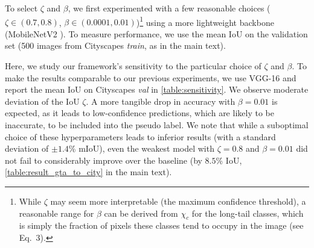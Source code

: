 To select $\zeta$ and $\beta$, we first experimented with a few reasonable choices ($\zeta \in (0.7, 0.8)$, $\beta \in (0.0001, 0.01)$)\footnote{While $\zeta$ may seem more interpretable (the maximum confidence threshold), a reasonable range for $\beta$ can be derived from $\chi_c$ for the long-tail classes, which is simply the fraction of pixels these classes tend to occupy in the image (see Eq.~3).} using a more lightweight backbone (MobileNetV2 ).
To measure performance, we use the mean IoU on the validation set (500 images from Cityscapes \textit{train}, as in the main text).

Here, we study our framework's sensitivity to the particular choice of $\zeta$ and $\beta$.
To make the results comparable to our previous experiments, we use VGG-16 and report the mean IoU on Cityscapes \textit{val} in \cref{table:sensitivity}.
We observe moderate deviation of the IoU \wrt $\zeta$.
A more tangible drop in accuracy with $\beta = 0.01$ is expected, as it leads to low-confidence predictions, which are likely to be inaccurate, to be included into the pseudo label.
We note that while a suboptimal choice of these hyperparameters leads to inferior results (with a standard deviation of $\pm 1.4$\% mIoU), even the weakest model with $\zeta = 0.8$ and $\beta = 0.01$ did not fail to considerably improve over the baseline (by $8.5$\% IoU, \cf \cref{table:result_gta_to_city} in the main text).


